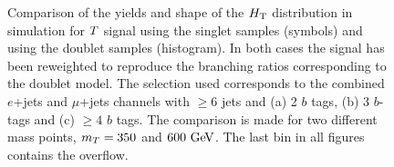 \begin{figure}[htbp]
\begin{center}
\caption{
Comparison of the yields and shape of the $\HT$ distribution in simulation for $\T$ signal using the singlet samples (symbols) and
using the doublet samples (histogram). In both cases the signal has been reweighted to reproduce the branching ratios corresponding 
to the doublet model. The selection used corresponds to the combined $e$+jets and $\mu$+jets channels
with $\geq 6$ jets and (a) 2 $b$ tags,  (b) 3 $b$-tags and (c) $\geq 4$ $b$ tags. The comparison is made for two 
different mass points, $m_{\T}=350$ and $600\gev$.
The last bin in all figures contains the overflow.
\label{fig:HT_checks_SingletvsDoubletComp}}
\end{center}
\end{figure}
